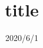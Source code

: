 \documentclass{beamer}
\title{title}
\author{}
\date{2020/6/1}
\begin{document}
\frame{\titlepage}

\begin{frame}
\end{frame}
\end{document}
